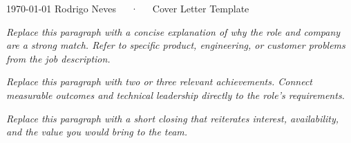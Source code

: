 \documentclass[11pt, a4paper]{awesome-cv}
\begin{document}
\makecvheader[C]

\makecvfooter
  {\today}
  {Rodrigo Neves~~~·~~~Cover Letter Template}
  {}

\makelettertitle

\begin{cvletter}

\textit{Replace this paragraph with a concise explanation of why the role and company are a strong match. Refer to specific product, engineering, or customer problems from the job description.}

\textit{Replace this paragraph with two or three relevant achievements. Connect measurable outcomes and technical leadership directly to the role's requirements.}

\textit{Replace this paragraph with a short closing that reiterates interest, availability, and the value you would bring to the team.}

\end{cvletter}


\makeletterclosing
\end{document}
